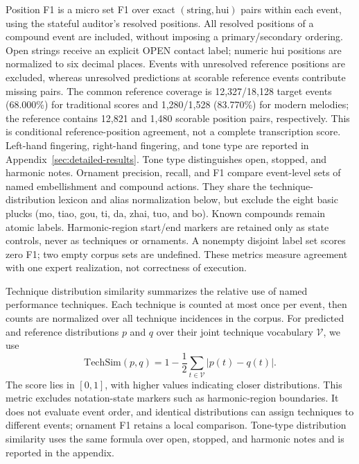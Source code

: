 Position F1 is a micro set F1 over exact $(\text{string},\text{hui})$ pairs within each event, using the stateful auditor's resolved positions. All resolved positions of a compound event are included, without imposing a primary/secondary ordering. Open strings receive an explicit OPEN contact label; numeric hui positions are normalized to six decimal places. Events with unresolved reference positions are excluded, whereas unresolved predictions at scorable reference events contribute missing pairs. The common reference coverage is 12,327/18,128 target events (68.000\%) for traditional scores and 1,280/1,528 (83.770\%) for modern melodies; the reference contains 12,821 and 1,480 scorable position pairs, respectively. This is conditional reference-position agreement, not a complete transcription score. Left-hand fingering, right-hand fingering, and tone type are reported in Appendix~\ref{sec:detailed-results}. Tone type distinguishes open, stopped, and harmonic notes. Ornament precision, recall, and F1 compare event-level sets of named embellishment and compound actions. They share the technique-distribution lexicon and alias normalization below, but exclude the eight basic plucks (mo, tiao, gou, ti, da, zhai, tuo, and bo). Known compounds remain atomic labels. Harmonic-region start/end markers are retained only as state controls, never as techniques or ornaments. A nonempty disjoint label set scores zero F1; two empty corpus sets are undefined. These metrics measure agreement with one expert realization, not correctness of execution.

Technique distribution similarity summarizes the relative use of named performance techniques. Each technique is counted at most once per event, then counts are normalized over all technique incidences in the corpus. For predicted and reference distributions $p$ and $q$ over their joint technique vocabulary $\mathcal V$, we use
\begin{equation}
\mathrm{TechSim}(p,q)=1-\frac{1}{2}\sum_{t\in\mathcal V}|p(t)-q(t)|.
\label{eq:technique-similarity}
\end{equation}
The score lies in $[0,1]$, with higher values indicating closer distributions. This metric excludes notation-state markers such as harmonic-region boundaries. It does not evaluate event order, and identical distributions can assign techniques to different events; ornament F1 retains a local comparison. Tone-type distribution similarity uses the same formula over open, stopped, and harmonic notes and is reported in the appendix.

